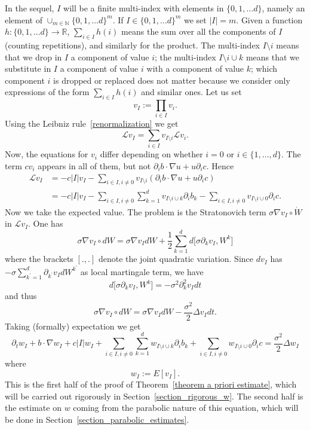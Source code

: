 \documentclass[a4paper,10pt]{article}
\begin{document}
In the sequel, $I$ will be a finite multi-index with elements in $\{0,1,\ldots
d\}$, namely an element of $\cup_{m\in\mathbb{N}}\{0,1,\ldots d\}^{m}$. If
$I\in\{0,1,\ldots d\}^{m}$ we set $\left\vert I\right\vert =m$. Given a
function $h:\{0,1,\ldots d\}\rightarrow\mathbb{R}$, $\sum_{i\in I}h(
i)$ means the sum over all the components of $I$ (counting repetitions), and similarly for
the product. The multi-index $I\setminus i$ means that we drop in $I$ a
component of value $i$; the multi-index $I\setminus i\cup k$ means that we
substitute in $I$ a component of value $i$ with a component of value
$k$; which component $i$ is dropped or replaced does not matter because we
consider only expressions of the form $\sum_{i\in I}h(i)$ and similar ones.
Let us set
\[
v_{I}:=\prod_{i\in I}v_{i}.
\]
Using the Leibniz rule~\eqref{renormalization} we get
\[
\mathcal{L}v_{I}=\sum_{i\in I}v_{I\setminus i}\mathcal{L}v_{i}.
\]
Now, the equations for $v_{i}$ differ depending on whether $i=0$ or $i \in \{1,\ldots,d\}$. The
term $cv_{i}$ appears in all of them, but not $\partial_{i}b\cdot\nabla
u+u\partial_{i}c$. Hence 
\begin{align*}
\mathcal{L}v_{I}  &  =-c\left\vert I\right\vert v_{I}-\sum_{i\in I,i\neq
0}v_{I\setminus i}(\partial_{i}b\cdot\nabla u+u\partial_{i}c) \\
&  =-c\left\vert I\right\vert v_{I}-\sum_{i\in I,i\neq0}\sum_{k=1} 
^{d}v_{I\setminus i\cup k}\partial_{i}b_{k}-\sum_{i\in I,i\neq0}v_{I\setminus
i\cup0}\partial_{i}c.
\end{align*}
Now we take the expected value. The problem is the Stratonovich term $\sigma\nabla
v_{I}\circ\dot{W}$ in $\mathcal{L}v_{I}$. One has 
\[
\sigma\nabla v_{I}\circ dW=\sigma\nabla v_{I}dW+\frac{1}{2}\sum_{k=1} 
^{d}d\big[  \sigma\partial_{k}v_{I},W^{k}\big]
\]
where the brackets $[  .,.]$ denote the joint quadratic variation.
Since $dv_{I}$ has $-\sigma\sum_{k^{\prime}=1}^{d}\partial_{k^{\prime}} 
v_{I}dW^{k^{\prime}}$ as local martingale term, we have
\[
d\big[  \sigma\partial_{k}v_{I},W^{k}\big]  =-\sigma^{2}\partial_{k} 
^{2}v_{I}dt
\]
and thus 
\[
\sigma\nabla v_{I}\circ dW=\sigma\nabla v_{I}dW-\frac{\sigma^{2}}{2}\Delta
v_{I}dt.
\]
Taking (formally) expectation we get 
\begin{equation}
\partial_{t}w_{I}+b\cdot\nabla w_{I}+c\left\vert I\right\vert w_{I}+\sum_{i\in
I,i\neq0}\sum_{k=1}^{d}w_{I\setminus i\cup k}\partial_{i}b_{k}+\sum_{i\in
I,i\neq0}w_{I\setminus i\cup0}\partial_{i}c=\frac{\sigma^{2}}{2}\Delta
w_{I}\label{PDE for w} 
\end{equation}
where 
\[
w_{I}:=E[  v_{I}]  .
\]
This is the first half of the proof of Theorem~\ref{theorem a priori estimate}, which will be carried out rigorously in Section~\ref{section_rigorous_w}. The second half is the estimate on $w$
coming from the parabolic nature of this equation, which will be done in Section~\ref{section_parabolic_estimates}.
\end{document}
